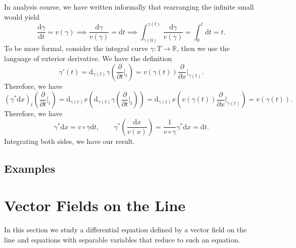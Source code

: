 \documentclass[../main.tex]{subfiles}
\begin{document}
\begin{remark}
  In analysis course, we have written informally that rearranging the infinite small would yield
  \begin{equation*}
    \frac{\mathrm{d} \gamma}{\mathrm{d} t} = v(\gamma) \implies \frac{\mathrm{d} \gamma}{v(\gamma)} = \mathrm{d} t \implies \int_{\gamma(0)}^{\gamma(t)} \frac{\mathrm{d} \gamma}{v(\gamma)} = \int_0^t \mathrm{d} t = t.
  \end{equation*}
  To be more formal, consider the integral curve $\gamma: T \rightarrow \mathbb{R}$, then we use the language of exterior derivative. We have the definition
  \begin{equation*}
    \gamma'(t) = \mathrm{d}_{\gamma(t)} \gamma \left( \frac{\partial }{\partial t} \bigg|_t \right) = v(\gamma(t)) \frac{\partial }{\partial x} \bigg|_{\gamma(t)}.
  \end{equation*}
  Therefore, we have
  \begin{equation*}
    (\gamma^* \mathrm{d} x)_t \left( \frac{\partial }{\partial t} \bigg|_t \right) = \mathrm{d}_{\gamma(t)} x \left( \mathrm{d}_{\gamma(t)} \gamma \left( \frac{\partial }{\partial t} \bigg|_t \right) \right) = \mathrm{d}_{\gamma(t)} x \left( v(\gamma(t)) \frac{\partial }{\partial x} \bigg|_{\gamma(t)} \right) = v(\gamma(t)).
  \end{equation*}
  Therefore, we have
  \begin{equation*}
    \gamma^* \mathrm{d} x = v \circ \gamma \mathrm{d} t, \qquad \gamma^* \left( \frac{\mathrm{d} x}{v(x)} \right) = \frac{1}{v \circ \gamma} \gamma^* \mathrm{d} x = \mathrm{d} t.
  \end{equation*}
  Integrating both sides, we have our result.
\end{remark}


\subsection{Examples}

\section{Vector Fields on the Line}
In this section we study a differential equation defined by a vector field on the line and equations with separable variables that reduce to such an equation.
\end{document}
